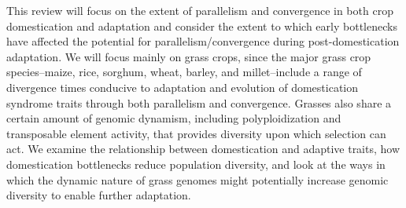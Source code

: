 \documentclass[12pt]{article}
\begin{document}
This review will focus on the extent of parallelism and convergence in both crop domestication and adaptation and consider the extent to which early bottlenecks have affected the potential for parallelism/convergence during post-domestication adaptation.
We will focus mainly on grass crops, since the major grass crop species--maize, rice, sorghum, wheat, barley, and millet--include a range of divergence times conducive to adaptation and evolution of domestication syndrome traits through both parallelism and convergence.
Grasses also share a certain amount of genomic dynamism, including polyploidization and transposable element activity, that provides diversity upon which selection can act.
We examine the relationship between domestication and adaptive traits, how domestication bottlenecks reduce population diversity, and look at the ways in which the dynamic nature of grass genomes might potentially increase genomic diversity to enable further adaptation.
\paragraph{}
\end{document}
